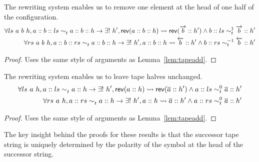 \documentclass[a4paper,UKenglish,cleveref, autoref]{lipics-v2019}
\newcommand{\strent}{\rightsquigarrow}
\begin{document}
\begin{lemma}\label{lem:taperem}
  The rewriting system enables us to remove one element at the head of one half of the configuration.
  \begin{align*}
    \forall ls~a~b~h, a::b::ls \reprt{} a::b::h \rightarrow \exists!~h', \rev{(a :: b :: h)} \strent{} \rev{(\polpos{b} :: h')} \land b :: ls \reprt{1} \polpos{b} :: h' \\
    \forall rs~a~b~h, a :: b :: rs \reprt{} a :: b :: h \rightarrow \exists!~h', a :: b :: h \strent{} \polneg{b} :: h' \land b :: rs \reprt{-1} \polneg{b} :: h'
  \end{align*}
\end{lemma}
\begin{proof}
  Uses the same style of arguments as Lemma~\ref{lem:tapeadd}.
\end{proof}

\begin{lemma}\label{lem:tapeid}
  The rewriting system enables us to leave tape halves unchanged. 
  \begin{align*}
    \forall ls~a~h, a :: ls \reprt{} a :: h \rightarrow \exists !~h', \rev{(a::h)} \strent{} \rev{(\polneut{a} :: h')} \land a :: ls \reprt{0} \polneut{a} :: h'\\
    \forall rs~a~h, a :: rs \reprt{} a :: h \rightarrow \exists !~h', a :: h \strent{} \polneut{a} :: h' \land a :: rs \reprt{0} \polneut{a} :: h'
  \end{align*}
\end{lemma}
\begin{proof}
  Uses the same style of arguments as Lemma~\ref{lem:tapeadd}.
\end{proof}

The key insight behind the proofs for these results is that the successor tape string is uniquely determined by the polarity of the symbol at the head of the successor string. 
\end{document}
